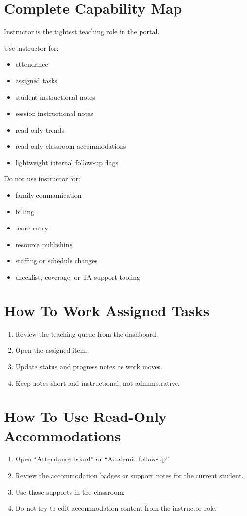 \documentclass[11pt]{article}
\begin{document}
\section*{Complete Capability Map}
Instructor is the tightest teaching role in the portal.

Use instructor for:
\begin{itemize}
  \item attendance
  \item assigned tasks
  \item student instructional notes
  \item session instructional notes
  \item read-only trends
  \item read-only classroom accommodations
  \item lightweight internal follow-up flags
\end{itemize}

Do not use instructor for:
\begin{itemize}
  \item family communication
  \item billing
  \item score entry
  \item resource publishing
  \item staffing or schedule changes
  \item checklist, coverage, or TA support tooling
\end{itemize}

\section*{How To Work Assigned Tasks}
\begin{enumerate}
  \item Review the teaching queue from the dashboard.
  \item Open the assigned item.
  \item Update status and progress notes as work moves.
  \item Keep notes short and instructional, not administrative.
\end{enumerate}

\section*{How To Use Read-Only Accommodations}
\begin{enumerate}
  \item Open ``Attendance board'' or ``Academic follow-up''.
  \item Review the accommodation badges or support notes for the current student.
  \item Use those supports in the classroom.
  \item Do not try to edit accommodation content from the instructor role.
\end{enumerate}
\end{document}
